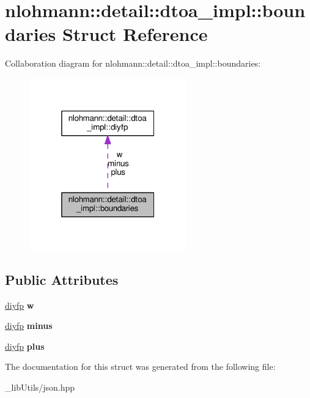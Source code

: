 \hypertarget{structnlohmann_1_1detail_1_1dtoa__impl_1_1boundaries}{}\section{nlohmann\+:\+:detail\+:\+:dtoa\+\_\+impl\+:\+:boundaries Struct Reference}
\label{structnlohmann_1_1detail_1_1dtoa__impl_1_1boundaries}


Collaboration diagram for nlohmann\+:\+:detail\+:\+:dtoa\+\_\+impl\+:\+:boundaries\+:\nopagebreak
\begin{figure}[H]
\begin{center}
\leavevmode
\includegraphics[width=193pt]{structnlohmann_1_1detail_1_1dtoa__impl_1_1boundaries__coll__graph}
\end{center}
\end{figure}
\subsection*{Public Attributes}
\begin{DoxyCompactItemize}
\item 
\hyperlink{structnlohmann_1_1detail_1_1dtoa__impl_1_1diyfp}{diyfp} {\bfseries w}\hypertarget{structnlohmann_1_1detail_1_1dtoa__impl_1_1boundaries_ad1668c60aeade5f2557fafed8b8aee1a}{}\label{structnlohmann_1_1detail_1_1dtoa__impl_1_1boundaries_ad1668c60aeade5f2557fafed8b8aee1a}

\item 
\hyperlink{structnlohmann_1_1detail_1_1dtoa__impl_1_1diyfp}{diyfp} {\bfseries minus}\hypertarget{structnlohmann_1_1detail_1_1dtoa__impl_1_1boundaries_aec4e5028333c01f3229062f31ce16763}{}\label{structnlohmann_1_1detail_1_1dtoa__impl_1_1boundaries_aec4e5028333c01f3229062f31ce16763}

\item 
\hyperlink{structnlohmann_1_1detail_1_1dtoa__impl_1_1diyfp}{diyfp} {\bfseries plus}\hypertarget{structnlohmann_1_1detail_1_1dtoa__impl_1_1boundaries_a3321ae2816a6ec5250a0d8e29f798232}{}\label{structnlohmann_1_1detail_1_1dtoa__impl_1_1boundaries_a3321ae2816a6ec5250a0d8e29f798232}

\end{DoxyCompactItemize}


The documentation for this struct was generated from the following file\+:\begin{DoxyCompactItemize}
\item 
\+\_\+lib\+Utils/json.\+hpp\end{DoxyCompactItemize}
